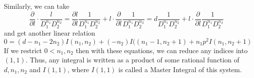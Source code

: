 \documentclass[10pt]{article}
\begin{document}
Similarly, we can take 
\begin{equation}
\nonumber
\frac{\partial}{\partial l} \cdot \frac{l}{D_1^{n_1} D_2^{n_2}}
= 
\frac{\partial l}{\partial l} \frac{1}{D_1^{n_1} D_2^{n_2}}
+
l\cdot
\frac{\partial}{\partial l} \frac{1}{D_1^{n_1} D_2^{n_2}}
=
d \frac{1}{D_1^{n_1} D_2^{n_2}}
+
l\cdot
\frac{\partial}{\partial l} \frac{1}{D_1^{n_1} D_2^{n_2}}
\end{equation}
and get another linear relation
\begin{equation}
\nonumber
0 = (d-n_1 -2n_2)I(n_1,n_2) + (-n_2) I((n_1-1, n_2+1) + n_1 p^2 I(n_1, n_2+1) 
\end{equation}
If we restrict $0 < n_1, n_2$ then with these equations, we can reduce any indices into $(1,1)$.
Thus, any integral is written as a product of some rational function of $d, n_1,n_2$ and $I(1,1)$, where $I(1,1)$ is called a Master Integral of this system.
\end{document}

